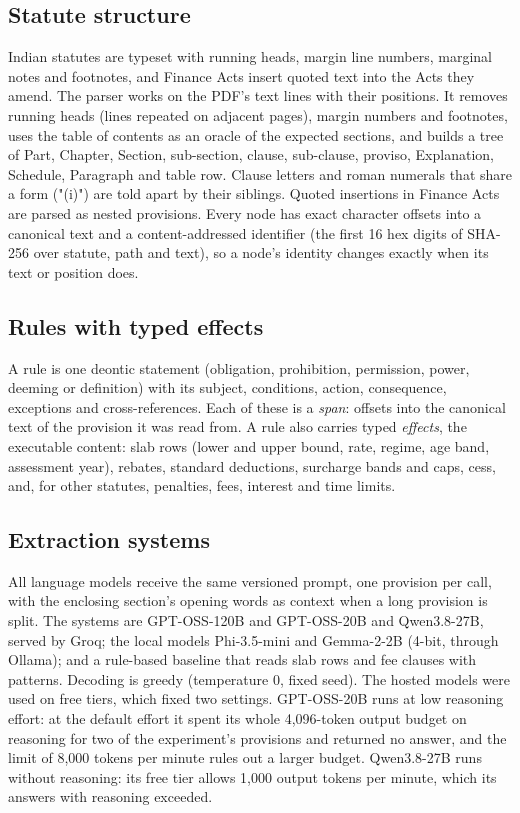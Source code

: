 \documentclass[sn-apa]{sn-jnl}
\begin{document}
\subsection{Statute structure}
Indian statutes are typeset with running heads, margin line numbers,
marginal notes and footnotes, and Finance Acts insert quoted text into the
Acts they amend. The parser works on the PDF's text lines with their
positions. It removes running heads (lines repeated on adjacent pages),
margin numbers and footnotes, uses the table of contents as an oracle of the
expected sections, and builds a tree of Part, Chapter, Section,
sub-section, clause, sub-clause, proviso, Explanation, Schedule, Paragraph
and table row. Clause letters and roman numerals that share a form ("(i)")
are told apart by their siblings. Quoted insertions in Finance Acts are
parsed as nested provisions. Every node has exact character offsets into a
canonical text and a content-addressed identifier
(the first 16 hex digits of SHA-256 over statute, path and text), so a node's
identity changes exactly when its text or position does.

\subsection{Rules with typed effects}
A rule is one deontic statement (obligation, prohibition, permission, power,
deeming or definition) with its subject, conditions, action, consequence,
exceptions and cross-references. Each of these is a \emph{span}: offsets into
the canonical text of the provision it was read from. A rule also carries
typed \emph{effects}, the executable content: slab rows (lower and upper bound,
rate, regime, age band, assessment year), rebates, standard deductions,
surcharge bands and caps, cess, and, for other statutes, penalties, fees,
interest and time limits.

\subsection{Extraction systems}
All language models receive the same versioned prompt, one provision per
call, with the enclosing section's opening words as context when a long
provision is split. The systems are GPT-OSS-120B and GPT-OSS-20B
\citep{openai2025gptoss} and Qwen3.8-27B, served by Groq; the local models
Phi-3.5-mini \citep{abdin2024phi3} and Gemma-2-2B \citep{gemmateam2024gemma2}
(4-bit, through Ollama); and a rule-based baseline that reads slab rows and
fee clauses with patterns. Decoding is greedy (temperature 0, fixed seed).
The hosted models were used on free tiers, which fixed two settings.
GPT-OSS-20B runs at low reasoning effort: at the default effort it spent its
whole 4,096-token output budget on reasoning for two of the experiment's
provisions and returned no answer, and the limit of 8,000 tokens per minute
rules out a larger budget. Qwen3.8-27B runs without reasoning: its free tier
allows 1,000 output tokens per minute, which its answers with reasoning
exceeded.
\end{document}
